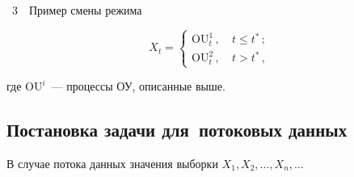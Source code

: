 \begin{multicols}{2}
\begin{center}
\vspace*{3pt}





\noindent


{{\figurename~3}\ \ \small{Пример смены режима}}


\end{center}











 \vspace*{6pt}











\addtocounter{figure}{1}








\noindent


\begin {equation*}


        X_t =                \begin{cases}


                \mathrm{OU}_t^1\,, &\ t \leqslant t^*\,; \\


                \mathrm{OU}_t^2\,, &\ t > t^*\,,


                \end{cases}


        \end {equation*}


        где $\mathrm{OU}^i$~--- процессы ОУ, описанные выше.





        





\subsection{Постановка задачи для~потоковых данных}





            В случае потока данных значения выборки $X_1,X_2,\ldots,X_n, \ldots$ 



\end{multicols}
